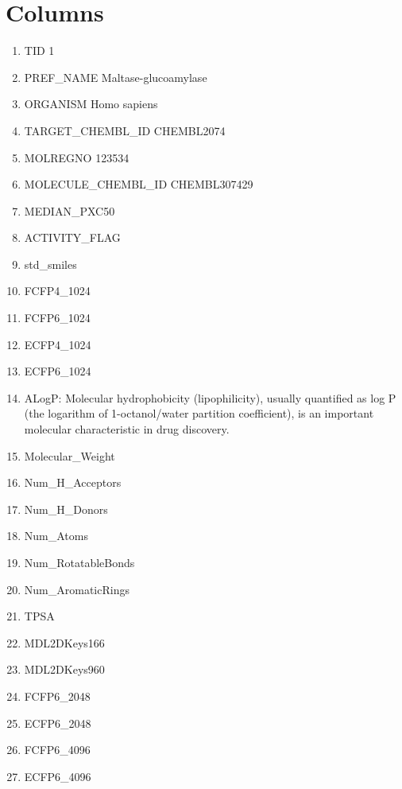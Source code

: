 \documentclass[a4paper,12pt, english]{article}
\begin{document}
\section{Columns}
\begin{enumerate}
	\item TID     1
	\item PREF\_NAME       Maltase-glucoamylase                
	\item ORGANISM       Homo sapiens
	\item TARGET\_CHEMBL\_ID        CHEMBL2074
	\item MOLREGNO        123534
	\item MOLECULE\_CHEMBL\_ID  CHEMBL307429    
	\item MEDIAN\_PXC50     
	\item ACTIVITY\_FLAG   
	\item std\_smiles      
	\item FCFP4\_1024      
	\item FCFP6\_1024      
	\item ECFP4\_1024      
	\item ECFP6\_1024      
	\item ALogP:  Molecular hydrophobicity (lipophilicity), usually quantified as log P (the logarithm of 1-octanol/water partition coefficient), is an important molecular characteristic in drug discovery.
	\item Molecular\_Weight        
	\item Num\_H\_Acceptors 
	\item Num\_H\_Donors    
	\item Num\_Atoms       
	\item Num\_RotatableBonds      
	\item Num\_AromaticRings       
	\item TPSA    
	\item MDL2DKeys166    
	\item MDL2DKeys960    
	\item FCFP6\_2048      
	\item ECFP6\_2048      
	\item FCFP6\_4096      
	\item ECFP6\_4096
\end{enumerate}  			
		
\end{document}

